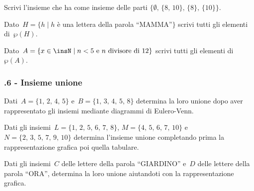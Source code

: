 \begin{esercizio}
 \label{ese:\thechapter.49}
 Scrivi l'insieme che ha come insieme delle parti
$\{\emptyset\text{, }\{\text{8, 10}\}\text{, }\{8\}\text{, }\{10\}\}$.
\end{esercizio}

\begin{esercizio}
 \label{ese:\thechapter.50}
Dato~$H=\{h\mid h$ è una lettera della parola ``MAMMA''$\}$ scrivi
tutti gli elementi di~$\wp (H)$.
\end{esercizio}

\begin{esercizio}
 \label{ese:\thechapter.51}
 Dato~$A=\{x\in\insN\mid n<5\text{ e }n\text{ divisore di~12}\}$ scrivi tutti gli elementi di
$\wp (A)$.
\end{esercizio}

\subsubsection*{\thechapter.6 - Insieme unione}
\begin{esercizio}
 \label{ese:\thechapter.52}
Dati~$A=\{\text{1, 2, 4, 5}\}$ e~$B=\{\text{1, 3, 4, 5, 8}\}$ determina la loro unione dopo
aver rappresentato gli insiemi mediante diagrammi di Eulero-Venn.
 \end{esercizio}

\begin{esercizio}
 \label{ese:\thechapter.53}
 Dati gli insiemi~$L=\{\text{1, 2, 5, 6, 7, 8}\}$, $M=\{\text{4, 5, 6, 7, 10}\}$ e~$N=\{\text{2, 3, 5, 7, 9, 10}\}$
determina l'insieme unione completando prima la rappresentazione
grafica poi quella tabulare.
\begin{center}
 
\end{center}
\end{esercizio}

\begin{esercizio}
 \label{ese:\thechapter.54}
Dati gli insiemi~$C$ delle lettere della parola ``GIARDINO'' e~$D$ delle lettere della
parola ``ORA'', determina la loro unione aiutandoti con la rappresentazione grafica.
 \end{esercizio}

